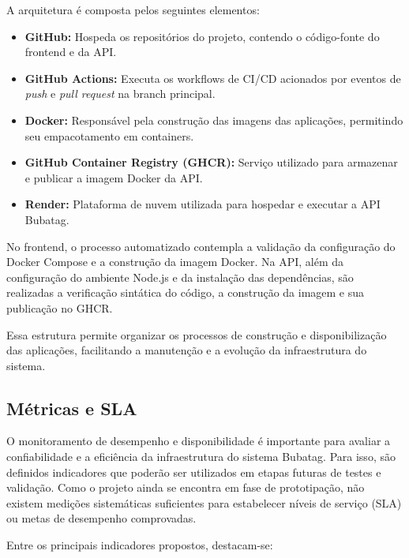 \documentclass[11pt,a4paper]{article}
\begin{document}
A arquitetura é composta pelos seguintes elementos:

\begin{itemize}
    \item \textbf{GitHub:} Hospeda os repositórios do projeto, contendo o código-fonte do frontend e da API.

    \item \textbf{GitHub Actions:} Executa os workflows de CI/CD acionados por eventos de \textit{push} e \textit{pull request} na branch principal.

    \item \textbf{Docker:} Responsável pela construção das imagens das aplicações, permitindo seu empacotamento em containers.

    \item \textbf{GitHub Container Registry (GHCR):} Serviço utilizado para armazenar e publicar a imagem Docker da API.

    \item \textbf{Render:} Plataforma de nuvem utilizada para hospedar e executar a API Bubatag.
\end{itemize}

No frontend, o processo automatizado contempla a validação da configuração do Docker Compose e a construção da imagem Docker. Na API, além da configuração do ambiente Node.js e da instalação das dependências, são realizadas a verificação sintática do código, a construção da imagem e sua publicação no GHCR.

Essa estrutura permite organizar os processos de construção e disponibilização das aplicações, facilitando a manutenção e a evolução da infraestrutura do sistema.

\subsection{Métricas e SLA}

O monitoramento de desempenho e disponibilidade é importante para avaliar a confiabilidade e a eficiência da infraestrutura do sistema Bubatag. Para isso, são definidos indicadores que poderão ser utilizados em etapas futuras de testes e validação. Como o projeto ainda se encontra em fase de prototipação, não existem medições sistemáticas suficientes para estabelecer níveis de serviço (SLA) ou metas de desempenho comprovadas.

Entre os principais indicadores propostos, destacam-se:
\end{document}
